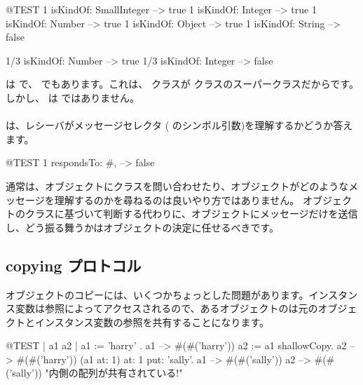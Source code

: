 \documentclass[a4paper,10pt,twoside]{book}
\begin{document}
\begin{code}{@TEST}
1 isKindOf: SmallInteger --> true
1 isKindOf: Integer          --> true
1 isKindOf: Number         --> true
1 isKindOf: Object           --> true
1 isKindOf: String            --> false

1/3 isKindOf: Number      --> true
1/3 isKindOf: Integer        --> false
\end{code}

 は  で、 でもあります。これは、 クラスが  クラスのスーパークラスだからです。しかし、 は  ではありません。

\paragraph{}
 は、レシーバがメッセージセレクタ ( のシンボル引数)を理解するかどうか答えます。

\begin{code}{@TEST}
1 respondsTo: #, --> false
\end{code}

通常は、オブジェクトにクラスを問い合わせたり、オブジェクトがどのようなメッセージを理解するのかを尋ねるのは良いやり方ではありません。
オブジェクトのクラスに基づいて判断する代わりに、オブジェクトにメッセージだけを送信し、どう振る舞うかはオブジェクトの決定に任せるべきです。%

\subsection{copying プロトコル}

オブジェクトのコピーには、いくつかちょっとした問題があります。インスタンス変数は参照によってアクセスされるので、あるオブジェクトのは元のオブジェクトとインスタンス変数の参照を共有することになります。%

\begin{code}{@TEST | a1 a2 |}
a1 := { { 'harry' } }.
a1 --> #(#('harry'))
a2 := a1 shallowCopy.
a2 --> #(#('harry'))
(a1 at: 1) at: 1 put: 'sally'.
a1 --> #(#('sally'))
a2 --> #(#('sally'))    "内側の配列が共有されている!"
\end{code}
\end{document}
